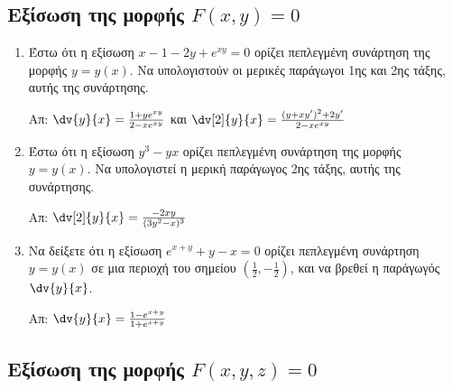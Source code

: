 \subsection*{Εξίσωση της μορφής \ensuremath{F(x,y)=0}}

\begin{enumerate}
    \item Έστω ότι η εξίσωση $ x-1-2y+e^{xy} = 0 $ ορίζει πεπλεγμένη συνάρτηση της 
        μορφής $ y = y(x) $. Να υπολογιστούν οι μερικές παράγωγοι 
        1ης και 2ης τάξης, αυτής της συνάρτησης.

        \hfill Απ: $ \dv{y}{x} = \frac{1+ye^{xy}}{2-xe^{xy}} $ και $ \dv[2]{y}{x}
        = \frac{(y+xy')^{2}+2y'}{2-xe^{xy}} $ 

    \item Έστω ότι η εξίσωση $ y^{3} - yx $ ορίζει πεπλεγμένη συνάρτηση της 
        μορφής $ y = y(x) $. Να υπολογιστεί η μερική παράγωγος 2ης τάξης, αυτής 
        της συνάρτησης.

        \hfill Απ: $ \dv[2]{y}{x} = \frac{ -2xy }{ (3y^{2} - x)^{3} }  $ 

    \item Να δείξετε ότι η εξίσωση $ e^{x+y} + y- x = 0 $ ορίζει πεπλεγμένη συνάρτηση 
        $ y=y(x) $ σε μια περιοχή του σημείου $ \left(\frac{1}{2}, - 
        \frac{1}{2}\right) $, και να βρεθεί η παράγωγός $ \dv{y}{x} $.

        \hfill Απ: $ \dv{y}{x} = \frac{1-e^{x+y}}{1+e^{x+y}} $  
\end{enumerate}

\subsection*{Εξίσωση της μορφής \ensuremath{F(x,y,z)=0}}

